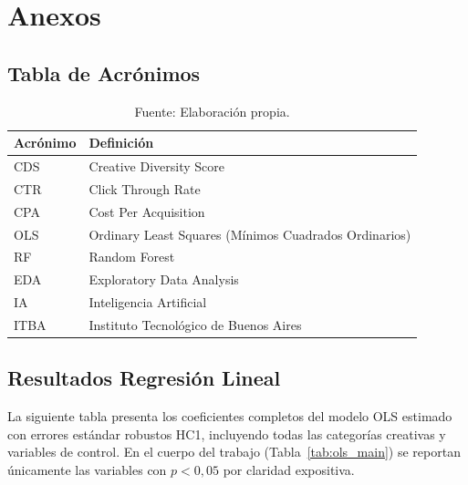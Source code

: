 \documentclass[12pt, a4paper]{report}
\begin{document}
\appendix
\chapter{Anexos}

\section{Tabla de Acrónimos}

\begin{table}[H]
  \centering
  \caption{Tabla de acrónimos utilizados en el trabajo}
  \label{tab:acronimos}
  \begin{tabular}{ll}
    \toprule
    \textbf{Acrónimo} & \textbf{Definición} \\
    \midrule
    CDS  & Creative Diversity Score \\
    CTR  & Click Through Rate \\
    CPA  & Cost Per Acquisition \\
    OLS  & Ordinary Least Squares (Mínimos Cuadrados Ordinarios) \\
    RF   & Random Forest \\
    EDA  & Exploratory Data Analysis \\
    IA   & Inteligencia Artificial \\
    ITBA & Instituto Tecnológico de Buenos Aires \\
    \bottomrule
  \end{tabular}
  \caption*{\small Fuente: Elaboración propia.}
\end{table}

\section{Resultados Regresión Lineal}

La siguiente tabla presenta los coeficientes completos del modelo OLS estimado con
errores estándar robustos HC1, incluyendo todas las categorías creativas y variables
de control. En el cuerpo del trabajo (Tabla~\ref{tab:ols_main}) se reportan únicamente
las variables con $p < 0{,}05$ por claridad expositiva.



\end{document}
